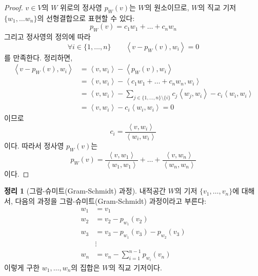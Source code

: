 \documentclass[unfonts,oneside,a4paper]{oblivoir}
\theoremstyle{definition}
\theoremstyle{theorem}
\newtheorem{theorem}{정리}[section]
\theoremstyle{theorem}
\theoremstyle{remark}
\theoremstyle{remark}
\theoremstyle{remark}
\theoremstyle{remark}
\renewcommand{\vec}[1]{\bm{\mathit{#1}}}
\begin{document}
\begin{proof}
    $\vec v \in V$의 $W$ 위로의 정사영 $p_W (\vec v)$는 $W$의 원소이므로, $W$의 직교 기저 $\{\vec w_1, \dots \vec w_n\}$의 선형결합으로 표현할 수 있다:
    \begin{equation*}
        p_W (\vec v) = c_1 \vec w_1 + \dots + c_n \vec w_n
    \end{equation*}
    그리고 정사영의 정의에 따라
    \begin{equation*}
        \forall i \in \{1, \dots, n\} \qquad \left<\vec v - p_W (\vec v), \vec w_i\right> = 0
    \end{equation*}
    를 만족한다.
    정리하면,
    \begin{align*}
        \left<\vec v - p_W (\vec v), \vec w_i\right> &= \left<\vec v, \vec w_i\right> - \left<p_W (\vec v), \vec w_i\right>\\
                                                     &= \left<\vec v, \vec w_i \right> - \left<c_1 \vec w_1 + \dots + c_n \vec w_n, \vec w_i\right>\\
                                                     &= \left<\vec v, \vec w_i \right> - \sum_{j \in \{1, \dots, n\} \setminus \{i\}} c_j \left<\vec w_j, \vec w_i\right> - c_i \left<\vec w_i, \vec w_i\right>\\
                                                     &= \left<\vec v, \vec w_i \right> - c_i \left<\vec w_i, \vec w_i\right> = 0
    \end{align*}
    이므로
    \begin{equation*}
        c_i = \frac{\left<\vec v, \vec w_i\right>}{\left<\vec w_i, \vec w_i\right>}
    \end{equation*}
    이다.
    따라서 정사영 $p_W (\vec v)$는
    \begin{equation*}
        p_W (\vec v) = \frac{\left<\vec v, \vec w_1\right>}{\left<\vec w_1, \vec w_1\right>} + \dots + \frac{\left<\vec v, \vec w_n\right>}{\left<\vec w_n, \vec w_n\right>}
    \end{equation*}
    이다.
\end{proof}

\begin{theorem} [그람-슈미트(Gram-Schmidt) 과정]
    내적공간 $W$의 기저 $\{\vec v_1, \dots, \vec v_n\}$에 대해서, 다음의 과정을 그람-슈미트(Gram-Schmidt) 과정이라고 부른다:
    \begin{align*}
        \vec w_1 &= \vec v_1\\
        \vec w_2 &= \vec v_2 - p_{\vec w_1} (\vec v_2)\\
        \vec w_3 &= \vec v_3 - p_{\vec w_1} (\vec v_3) - p_{\vec w_2} (\vec v_3)\\
                 &\vdots\\
        \vec w_n &= \vec v_n - \sum_{i = 1}^{n - 1} p_{\vec w_i} (\vec v_n)
    \end{align*}
    이렇게 구한 $\vec w_1, \dots, \vec w_n$의 집합은 $W$의 직교 기저이다.
\end{theorem}
\end{document}

